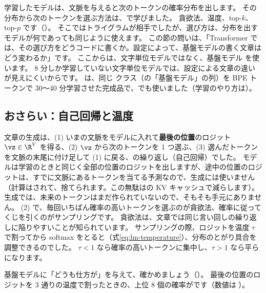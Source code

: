 学習したモデルは、文脈を与えると次のトークンの確率分布を出します。
その分布から次のトークンを選ぶ方法は、で学びました。
貪欲法、温度、top-$k$、top-$p$ です（）。
そこではトライグラムが相手でしたが、選び方は、分布を出すモデルが何であっても同じように使えます。
この節の問いは、「Transformer では、その選び方をどうコードに書くか。設定によって、基盤モデルの書く文章はどう変わるか」です。
ここからは、文字単位モデルではなく、基盤モデル  を使います。
8 分しか学習していない文字単位モデルでは、設定による文章の違いが見えにくいからです。
 は、同じ  クラス（の「基盤モデル」の列）を BPE トークンで 30〜40 分学習させた完成品で、でも使いました（学習のやり方は）。

\subsection*{おさらい：自己回帰と温度}

文章の生成は、(1) いまの文脈をモデルに入れて\textbf{最後の位置}のロジット $\vz\in\R^V$ を得る、(2) $\vz$ から次のトークンを 1 つ選ぶ、(3) 選んだトークンを文脈の末尾に付け足して (1) に戻る、の繰り返し（自己回帰）でした。
モデルは学習のときと同じく全部の位置のロジットを出しますが、途中の位置のロジットは、すでに文脈にあるトークンを当てる予測なので、生成には使いません（計算はされて、捨てられます。この無駄はの KV キャッシュで減らします）。
生成では、未来のトークンはまだ作られていないので、そもそも手元にありません。
(2) で、毎回いちばん確率の高いトークンを選ぶのが貪欲法、確率に従ってくじを引くのがサンプリングです。
貪欲法は、文章では同じ言い回しの繰り返しに陥りやすいことが知られています\cite{holtzman2020curious}。
サンプリングの際、ロジットを温度 $\tau$ で割ってから softmax をとると（式\eqref{eq:lm-temperature}）、分布のとがり具合を調整できるのでした。
$\tau<1$ なら確率の高いトークンに集中し、$\tau>1$ なら平らになります。

基盤モデルに「どうも仕方が」を与えて、確かめましょう（）。
最後の位置のロジットを 3 通りの温度で割ったときの、上位 8 個の確率がです（数値は ）。

